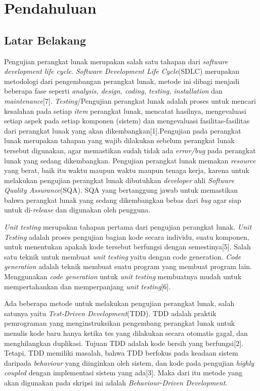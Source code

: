 \chapter{Pendahuluan}
\label{chap:intro}
   
\section{Latar Belakang}
\label{sec:label}
Pengujian perangkat lunak merupakan salah satu tahapan dari \textit{software development life cycle}. \textit{Software Development Life Cycle}(SDLC) merupakan metodologi dari pengembangan perangkat lunak, metode ini dibagi menjadi beberapa fase seperti\textit{ analysis, design,  coding,  testing, installation} dan \textit{maintenance}[7]. \textit{Testing}/Pengujian perangkat lunak adalah proses untuk mencari kesalahan pada setiap \textit{item} perangkat lunak, mencatat hasilnya, mengevaluasi setiap aspek pada setiap komponen (sistem) dan mengevaluasi fasilitas-fasilitas dari perangkat lunak yang akan dikembangkan[1].Pengujian pada perangkat lunak merupakan tahapan yang wajib dilakukan sebelum perangkat lunak tersebut digunakan, agar memastikan sudah tidak ada \textit{error/bug} pada perangkat lunak yang sedang dikembangkan. Pengujian perangkat lunak memakan \textit{resource} yang berat, baik itu waktu maupun waktu maupun tenaga kerja, karena untuk melakukan pengujian perangkat lunak dibutuhkan \textit{developer} ahli \textit{Software Quality Assurance}(SQA). SQA yang bertanggung jawab untuk memastikan bahwa perangkat lunak yang sedang dikembangkan bebas dari \textit{bug} agar siap untuk di-\textit{release} dan digunakan oleh pengguna.

\textit{Unit testing} merupakan tahapan pertama dari pengujian perangkat lunak. \textit{Unit Testing} adalah proses pengujian bagian kode secara individu, suatu komponen, untuk menentukan apakah kode tersebut berfungsi dengan semestinya[5]. Salah satu teknik untuk membuat \textit{unit testing} yaitu dengan code generation. \textit{Code generation} adalah teknik membuat suatu program yang membuat program lain. Menggunakan \textit{code generation} untuk \textit{unit testing} membuatnya mudah untuk mempertahankan dan memperpanjang \textit{unit testing}[6].

Ada beberapa metode untuk melakukan pengujian perangkat lunak, salah satunya yaitu \textit{Test-Driven Development}(TDD). TDD adalah praktik pemrograman yang menginstruksikan pengembang perangkat lunak untuk menulis kode baru hanya ketika tes yang dilakukan secara otomatis gagal, dan menghilangkan duplikasi. Tujuan TDD adalah kode bersih yang berfungsi[2]. Tetapi, TDD memiliki masalah, bahwa TDD berfokus pada keadaan sistem daripada \textit{behaviour} yang diinginkan oleh sistem, dan kode pada pengujian \textit{highly coupled} dengan implementasi sistem yang ada[3]. Maka dari itu metode yang akan digunakan pada skripsi ini adalah \textit{Behaviour-Driven Development}.

